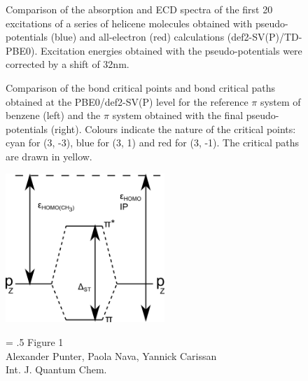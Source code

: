 \documentclass[12pt]{article}
\begin{document}
\begin{figure}
\caption{Comparison of the absorption and ECD spectra of the first 20 excitations of a series of helicene molecules obtained with pseudo-potentials (blue) and all-electron (red) calculations (def2-SV(P)/TD-PBE0). 
Excitation energies obtained with the pseudo-potentials were corrected by a shift of 32nm.}
\label{fig:helicene_spectra}
\end{figure}

\begin{figure}
\caption{Comparison of the bond critical points and bond critical paths obtained at the PBE0/def2-SV(P)
level for the
reference $\pi$ system of benzene (left) and the $\pi$ system obtained with the final pseudo-potentials (right).
Colours indicate the nature of the critical points: cyan for (3, -3), blue for (3, 1) and red for (3, -1).
The critical paths are drawn in yellow.}
\label{fig:aim_c6h6}
\end{figure}

\clearpage

\begin{figure}
\begin{center}
\includegraphics[width=6cm]{diagram}
\end{center}
{\Large
\begin{minipage}[t]{3in}
\baselineskip = .5\baselineskip
Figure 1 \\
Alexander Punter, Paola Nava, Yannick Carissan\\
Int. J. Quantum Chem.
\end{minipage}
}
\end{figure}

\clearpage
\end{document}
